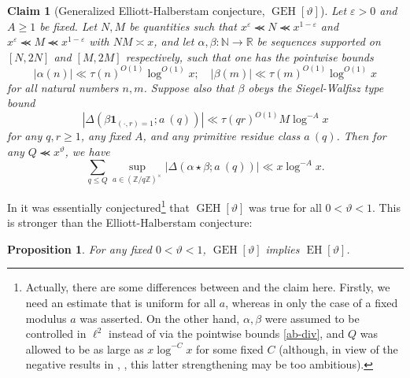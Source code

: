 \documentclass{bmcart}
\DeclareMathOperator*\EH{EH}
\DeclareMathOperator*\GEH{GEH}
\theoremstyle{plain}
\newtheorem{proposition}[theorem]{Proposition}
\newtheorem{claim}[theorem]{Claim}
\theoremstyle{definition}
\newcommand\R{\mathbb{R}}
\newcommand\Z{\mathbb{Z}}
\newcommand\N{\mathbb{N}}
\newcommand\eps{\varepsilon}
\renewcommand{\sim}{\asymp}
\renewcommand{\lessapprox}{\llcurly}
\newcommand{\onef}{\mathbf{1}}
\begin{document}
\begin{claim}[Generalized Elliott-Halberstam conjecture, {$\GEH[\vartheta]$}]\label{geh-def}  Let $\eps > 0$ and $A \geq 1$ be fixed.  Let $N,M$ be quantities such that
$x^\eps \lessapprox N \lessapprox x^{1-\eps}$ and $x^\eps \lessapprox M \lessapprox x^{1-\eps}$ with $NM \sim x$, and let $\alpha, \beta: \N \to \R$ be sequences supported on $[N,2N]$ and $[M,2M]$ respectively, such that one has the pointwise bounds
\begin{equation}\label{ab-div}
 |\alpha(n)| \ll \tau(n)^{O(1)} \log^{O(1)} x; \quad |\beta(m)| \ll \tau(m)^{O(1)} \log^{O(1)} x
\end{equation}
for all natural numbers $n,m$.  Suppose also that $\beta$ obeys the Siegel-Walfisz type bound
\begin{equation}\label{sig}
| \Delta(\beta \onef_{(\cdot,r)=1}; a\ (q)) | \ll \tau(qr)^{O(1)} M \log^{-A} x 
\end{equation}
for any $q,r \geq 1$, any fixed $A$, and any primitive residue class $a\ (q)$.  Then for any $Q \lessapprox x^\vartheta$, we have
\begin{equation}\label{qq-gen}
 \sum_{q \leq Q} \sup_{a \in (\Z/q\Z)^\times} |\Delta(\alpha \star \beta; a\ (q))| \ll x \log^{-A} x.
\end{equation} 
\end{claim}

In \cite[Conjecture 1]{bfi} it was essentially conjectured\footnote{Actually, there are some differences between \cite[Conjecture 1]{bfi} and the claim here.  Firstly, we need an estimate that is uniform for all $a$, whereas in \cite{bfi} only the case of a fixed modulus $a$ was asserted.  On the other hand, $\alpha,\beta$ were assumed to be controlled in $\ell^2$ instead of via the pointwise bounds \eqref{ab-div}, and $Q$ was allowed to be as large as $x \log^{-C} x$ for some fixed $C$ (although, in view of the negative results in \cite{fg}, \cite{fghm}, this latter strengthening may be too ambitious).} that $\GEH[\vartheta]$ was true for all $0 < \vartheta < 1$.   This is stronger than the Elliott-Halberstam conjecture:

\begin{proposition}\label{geh-eh}  For any fixed $0 < \vartheta < 1$, $\GEH[\vartheta]$ implies $\EH[\vartheta]$.
\end{proposition}
\end{document}
